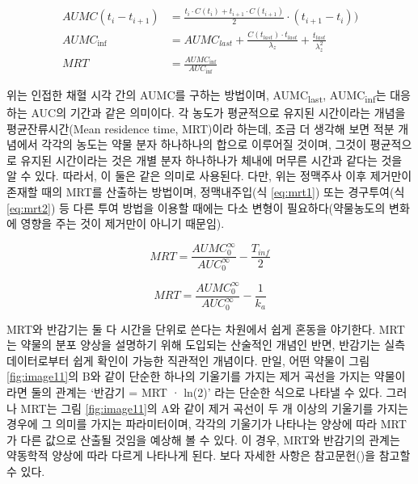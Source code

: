 \documentclass[
  11pt,
  krantz2, a4paper, twoside]{krantz}
\theoremstyle{definition}
\theoremstyle{definition}
\theoremstyle{definition}
\theoremstyle{definition}
\theoremstyle{remark}
\begin{document}
\begin{equation}
\begin{split}
  AUMC(t_i-t_{i+1}) &= \frac{t_i \cdot C(t_i) + t_{i+1} \cdot C(t_{i+1})}{2} \cdot (t_{i+1}-t_i)) \\
  AUMC_{\inf} &= AUMC_{last} + \frac{C(t_{last}) \cdot t_{last}}{\lambda_z} + \frac{t_{last}}{\lambda_z^2} \\
  MRT &= \frac{AUMC_{\inf}}{AUC_{\inf}}
\end{split}
\label{eq:mrteq}
\end{equation}

위는 인접한 채혈 시각 간의 AUMC를 구하는 방법이며, AUMC\textsubscript{last}, AUMC\textsubscript{inf}는 대응하는 AUC의 기간과 같은 의미이다.
각 농도가 평균적으로 유지된 시간이라는 개념을 평균잔류시간(Mean residence time, MRT)이라 하는데, 조금 더 생각해 보면 적분 개념에서 각각의 농도는 약물 분자 하나하나의 합으로 이루어질 것이며, 그것이 평균적으로 유지된 시간이라는 것은 개별 분자 하나하나가 체내에 머무른 시간과 같다는 것을 알 수 있다.
따라서, 이 둘은 같은 의미로 사용된다.
다만, 위는 정맥주사 이후 제거만이 존재할 때의 MRT를 산출하는 방법이며, 정맥내주입(식 \eqref{eq:mrt1}) 또는 경구투여(식 \eqref{eq:mrt2}) 등 다른 투여 방법을 이용할 때에는 다소 변형이 필요하다(약물농도의 변화에 영향을 주는 것이 제거만이 아니기 때문임).

\begin{equation}
MRT = \frac{AUMC_{0}^{\infty}}{AUC_{0}^{\infty}} - \frac{T_{inf}}{2}
\label{eq:mrt1}
\end{equation}

\begin{equation}
MRT = \frac{AUMC_{0}^{\infty}}{AUC_{0}^{\infty}} - \frac{1}{k_a}
\label{eq:mrt2}
\end{equation}

MRT와 반감기는 둘 다 시간을 단위로 쓴다는 차원에서 쉽게 혼동을 야기한다.
MRT는 약물의 분포 양상을 설명하기 위해 도입되는 산술적인 개념인 반면, 반감기는 실측데이터로부터 쉽게 확인이 가능한 직관적인 개념이다.
만일, 어떤 약물이 그림 \ref{fig:image11}의 B와 같이 단순한 하나의 기울기를 가지는 제거 곡선을 가지는 약물이라면 둘의 관계는 `반감기 = MRT · ln(2)' 라는 단순한 식으로 나타낼 수 있다.
그러나 MRT는 그림 \ref{fig:image11}의 A와 같이 제거 곡선이 두 개 이상의 기울기를 가지는 경우에 그 의미를 가지는 파라미터이며, 각각의 기울기가 나타나는 양상에 따라 MRT가 다른 값으로 산출될 것임을 예상해 볼 수 있다.
이 경우, MRT와 반감기의 관계는 약동학적 양상에 따라 다르게 나타나게 된다.
보다 자세한 사항은 참고문헌()을 참고할 수 있다.
\end{document}
